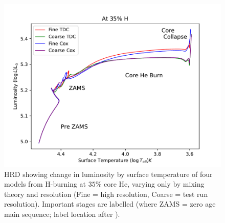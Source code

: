 \begin{figure}[H]
\begin{center}
    \includegraphics[width=0.9\linewidth]{Figures/HDR_Compare.pdf}
    \caption{\gls{HRD} showing change in luminosity by surface temperature of four models from H-burning at $35\%$ core He, varying only by mixing theory and resolution (Fine = high resolution, Coarse = test run resolution). Important stages are labelled (where ZAMS = zero age main sequence; label location after \citealp{Maeder09}).}
    \label{fig:HDR_Compare}
\end{center}
\end{figure}
